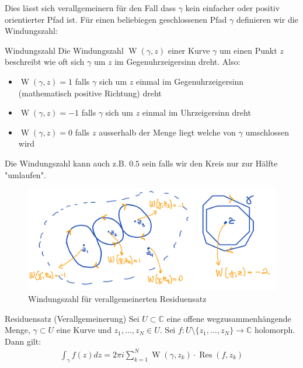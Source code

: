 \documentclass[a4paper,10pt]{article}
\begin{document}
Dies lässt sich verallgemeinern für den Fall dass $\gamma$ kein einfacher oder positiv orientierter Pfad ist. Für einen beliebiegen geschlossenen Pfad $\gamma$ definieren wir die Windungszahl:

\begin{subbox}{Windungszahl}
  Die Windungszahl \(\operatorname{W}(\gamma,z)\) einer Kurve \(\gamma\) um einen Punkt \(z\) beschreibt wie oft sich \(\gamma\) um \(z\) im Gegenuhrzeigersinn dreht. Also: 
  \begin{itemize}
    \item \(\operatorname{W}(\gamma,z) = 1\) falls $\gamma$ sich um $z$ einmal im Gegenuhrzeigersinn (mathematisch positive Richtung) dreht
    \item \(\operatorname{W}(\gamma,z) = -1\) falls $\gamma$ sich um $z$ einmal im Uhrzeigersinn dreht
    \item \(\operatorname{W}(\gamma,z) = 0\) falls $z$ ausserhalb der Menge liegt welche von $\gamma$ umschlossen wird 
  \end{itemize}
  Die Windungszahl kann auch z.B. $0.5$ sein falls wir den Kreis nur zur Hälfte "umlaufen".
\end{subbox}

\begin{figure}[H]
  \centering 
  \includegraphics[width=0.9\linewidth]{assets/4-2-2.png}
  \caption{Windungszahl für verallgemeinerten Residuensatz}
\end{figure}

\begin{subbox}{Residuensatz (Verallgemeinerung)}
  Sei \(U\subset\mathbb{C}\) eine offene wegzusammenhängende Menge, \(\gamma\subset U\) eine Kurve und \(z_1,\dots,z_N\in U\). Sei \(f\colon U\setminus\{z_1,\dots,z_N\}\to \mathbb{C}\) holomorph. Dann gilt: \begin{align*} \int_{\gamma} f(z)dz = 2\pi i \sum_{k=1}^N \operatorname{W}(\gamma ,z_k) \cdot \operatorname{Res}(f,z_k) \end{align*}
\end{subbox}
\end{document}

